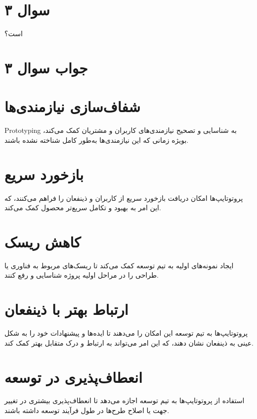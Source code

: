 \section*{سوال ۳}

 است؟

\section*{جواب سوال ۳}

\section{شفاف‌سازی نیازمندی‌ها}
Prototyping به شناسایی و تصحیح نیازمندی‌های کاربران و مشتریان کمک می‌کند، بویژه زمانی که این نیازمندی‌ها به‌طور کامل شناخته نشده باشند.

\section{بازخورد سریع}
پروتوتایپ‌ها امکان دریافت بازخورد سریع از کاربران و ذینفعان را فراهم می‌کنند، که این امر به بهبود و تکامل سریع‌تر محصول کمک می‌کند.

\section{کاهش ریسک}
ایجاد نمونه‌های اولیه به تیم توسعه کمک می‌کند تا ریسک‌های مربوط به فناوری یا طراحی را در مراحل اولیه پروژه شناسایی و رفع کنند.

\section{ارتباط بهتر با ذینفعان}
پروتوتایپ‌ها به تیم توسعه این امکان را می‌دهند تا ایده‌ها و پیشنهادات خود را به شکل عینی به ذینفعان نشان دهند، که این امر می‌تواند به ارتباط و درک متقابل بهتر کمک کند.

\section{انعطاف‌پذیری در توسعه}
استفاده از پروتوتایپ‌ها به تیم توسعه اجازه می‌دهد تا انعطاف‌پذیری بیشتری در تغییر جهت یا اصلاح طرح‌ها در طول فرآیند توسعه داشته باشند.

